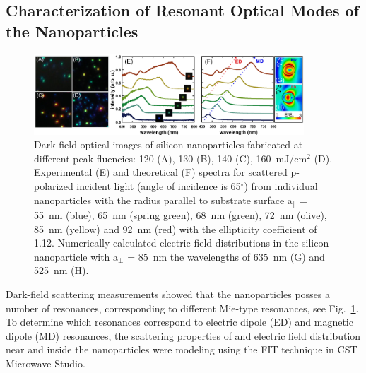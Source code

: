     \subsection{Characterization of Resonant Optical Modes of the Nanoparticles}
        \label{sec:DarkfieldExp}

        \begin{figure}[!ht]
                \begin{center}
                    \includegraphics[width=0.9\textwidth]{figs/results/char/DarkField.eps}
                \end{center}
                \caption{Dark-field optical images of silicon nanoparticles fabricated at different peak fluencies:
                120 (A), 130 (B), 140 (C), 160~mJ/cm$^{2}$ (D). Experimental (E) and theoretical (F) spectra for
                scattered p-polarized incident light (angle of incidence is 65$^{\circ}$) from individual nanoparticles
                with the radius parallel to substrate surface a$_{\parallel}$ = 55~nm (blue), 65~nm (spring green),
                68~nm (green), 72~nm (olive), 85~nm (yellow) and 92~nm (red) with the ellipticity coefficient of 1.12.
                Numerically calculated electric field distributions in the silicon nanoparticle with a$_{\perp}$ = 85~nm
                 the wavelengths of 635~nm (G) and 525~nm (H).}
                \label{fig:Darkfield}
        \end{figure}

            Dark-field scattering measurements showed that the nanoparticles posses a number of resonances, corresponding to different
        Mie-type resonances, see Fig.~\ref{fig:Darkfield}. To determine which resonances correspond to electric dipole (ED) and
        magnetic dipole (MD) resonances, the scattering properties of and electric field distribution near and inside the nanoparticles were
        modeling using the FIT technique in CST Microwave Studio.

